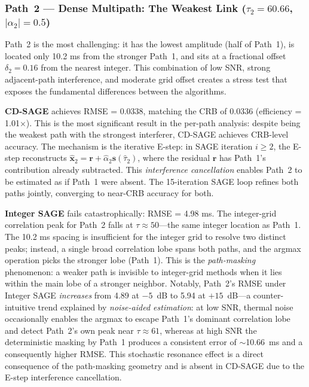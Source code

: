 \documentclass[a4paper,fleqn]{cas-dc}
\begin{document}
\subsubsection{Path~2 --- Dense Multipath: The Weakest Link ($\tau_2 = 60.66$, $|\alpha_2| = 0.5$)}

Path~2 is the most challenging: it has the lowest amplitude (half of Path~1), is located only 10.2 ms from the stronger Path~1, and sits at a fractional offset $\delta_2 = 0.16$ from the nearest integer. This combination of low SNR, strong adjacent-path interference, and moderate grid offset creates a stress test that exposes the fundamental differences between the algorithms.

\textbf{CD-SAGE} achieves RMSE = 0.0338, matching the CRB of 0.0336 (efficiency = 1.01$\times$). This is the most significant result in the per-path analysis: despite being the weakest path with the strongest interferer, CD-SAGE achieves CRB-level accuracy. The mechanism is the iterative E-step: in SAGE iteration $i \ge 2$, the E-step reconstructs $\hat{\mathbf{x}}_2 = \mathbf{r} + \hat{\alpha}_2\mathbf{s}(\hat{\tau}_2)$, where the residual $\mathbf{r}$ has Path~1's contribution already subtracted. This \textit{interference cancellation} enables Path~2 to be estimated as if Path~1 were absent. The 15-iteration SAGE loop refines both paths jointly, converging to near-CRB accuracy for both.

\textbf{Integer SAGE} fails catastrophically: RMSE = 4.98 ms. The integer-grid correlation peak for Path~2 falls at $\tau \approx 50$---the same integer location as Path~1. The 10.2 ms spacing is insufficient for the integer grid to resolve two distinct peaks; instead, a single broad correlation lobe spans both paths, and the argmax operation picks the stronger lobe (Path~1). This is the \textit{path-masking} phenomenon: a weaker path is invisible to integer-grid methods when it lies within the main lobe of a stronger neighbor. Notably, Path~2's RMSE under Integer SAGE \textit{increases} from 4.89 at $-5$~dB to 5.94 at $+15$~dB---a counter-intuitive trend explained by \textit{noise-aided estimation}: at low SNR, thermal noise occasionally enables the argmax to escape Path~1's dominant correlation lobe and detect Path~2's own peak near $\tau\approx61$, whereas at high SNR the deterministic masking by Path~1 produces a consistent error of $\sim$10.66~ms and a consequently higher RMSE. This stochastic resonance effect is a direct consequence of the path-masking geometry and is absent in CD-SAGE due to the E-step interference cancellation.
\end{document}

